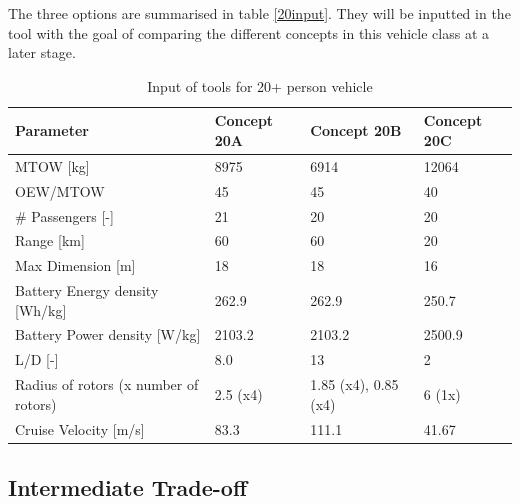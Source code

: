 The three options are summarised in table \autoref{20input}. They will be inputted in the tool with the goal of comparing the different concepts in this vehicle class at a later stage. 

\begin{table}[H]
\captionsetup{justification=centering}
\caption{Input of tools for 20+ person vehicle}
\label{20input}
\begin{tabular}{@{}llll@{}}
\toprule
\textbf{Parameter}                       & \textbf{Concept 20A} & \textbf{Concept 20B} & \textbf{Concept 20C} \\ \midrule
MTOW {[}kg{]}                            &    8975                &       6914             &  12064                  \\
OEW/MTOW           &        45            &           45         &      40              \\
\# Passengers {[}-{]}                    &        21            &        20            &       20             \\
Range {[}km{]}                           &        60            &        60            &           20         \\
Max Dimension {[}m{]}                    &          18         &        18            &          16          \\
Battery Energy density {[}Wh/kg{]}       &         262.9            &     262.9               &       250.7             \\
Battery Power density {[}W/kg{]}         &           2103.2        &        2103.2            &         2500.9           \\
L/D {[}-{]}                              &         8.0           &        13            &     2               \\
Radius of rotors (x number of rotors)  &           2.5 (x4)         &   1.85 (x4), 0.85 (x4)                 &     6 (1x)               \\
Cruise Velocity {[}m/s{]}                &          83.3          &        111.1            &  41.67                  \\ \bottomrule
\end{tabular}

\end{table}


\subsection{Intermediate Trade-off}

